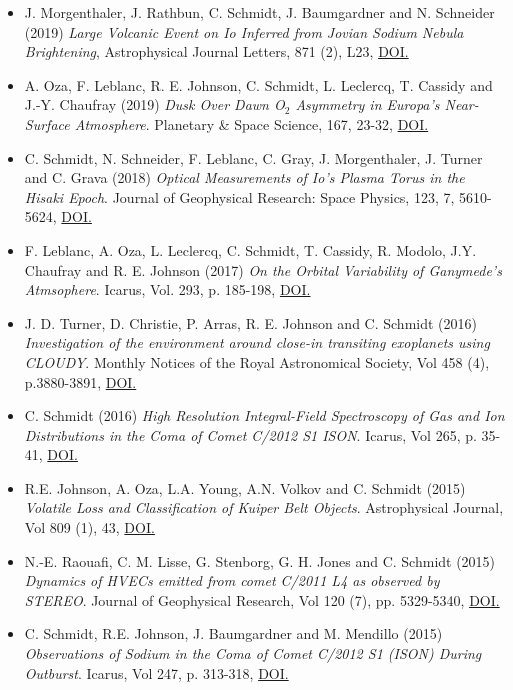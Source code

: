 \documentclass[12pt]{report}
\begin{document}
\begin{itemize}
  \item J. Morgenthaler, J. Rathbun, C. Schmidt, J. Baumgardner and N. Schneider (2019) \textit{Large Volcanic Event on Io Inferred from Jovian Sodium Nebula Brightening}, Astrophysical Journal Letters, 871 (2), L23, \href{https://doi.org/10.3847/2041-8213/aafdb7}{DOI.}
  \item A. Oza, F. Leblanc, R. E. Johnson, C. Schmidt, L. Leclercq, T. Cassidy and J.-Y. Chaufray (2019) \textit{Dusk Over Dawn O$_2$ Asymmetry in Europa's Near-Surface Atmosphere}. Planetary \& Space Science, 167, 23-32, \href{https://doi.org/10.1016/j.pss.2019.01.006}{DOI.}
  \item C. Schmidt, N. Schneider, F. Leblanc, C. Gray, J. Morgenthaler, J. Turner and C. Grava (2018) \textit{Optical Measurements of Io's Plasma Torus in the Hisaki Epoch}. Journal of Geophysical Research: Space Physics, 123, 7, 5610-5624, \href{https://doi.org/10.1029/2018JA025296}{DOI.}
  \item F. Leblanc, A. Oza, L. Leclercq, C. Schmidt, T. Cassidy, R. Modolo, J.Y. Chaufray and R. E. Johnson (2017) \textit{On the Orbital Variability of Ganymede's Atmsophere}. Icarus, Vol. 293, p. 185-198, \href{doi.org/10.1016/j.icarus.2017.04.025}{DOI.}
  \item J. D. Turner, D. Christie, P. Arras, R. E. Johnson and C. Schmidt (2016) \textit{Investigation of the environment around close-in transiting exoplanets using CLOUDY}. Monthly Notices of the Royal Astronomical Society, Vol 458 (4), p.3880-3891, \href{https://doi.org/10.1093/mnras/stw556}{DOI.}
  \item C. Schmidt (2016) \textit{High Resolution Integral-Field Spectroscopy of Gas and Ion Distributions in the Coma of Comet C/2012 S1 ISON}. Icarus, Vol 265, p. 35-41, \href{https://doi.org/10.1016/j.icarus.2015.10.009}{DOI.}
  \item R.E. Johnson, A. Oza, L.A. Young, A.N. Volkov and C. Schmidt (2015) \textit{Volatile Loss and Classification of Kuiper Belt Objects}. Astrophysical Journal, Vol 809 (1), 43, \href{https://doi.org/10.1088/0004-637X/809/1/43}{DOI.}
  \item N.-E. Raouafi, C. M. Lisse, G. Stenborg, G. H. Jones and C. Schmidt (2015) \textit{Dynamics of HVECs emitted from comet C/2011 L4 as observed by STEREO}. Journal of Geophysical Research, Vol 120 (7), pp. 5329-5340, \href{https://doi.org/10.1002/2014JA020926}{DOI.}
  \item C. Schmidt, R.E. Johnson, J. Baumgardner and M. Mendillo (2015) \textit{Observations of Sodium in the Coma of Comet C/2012 S1 (ISON) During Outburst}. Icarus, Vol 247, p. 313-318, \href{https://doi.org/10.1016/j.icarus.2014.10.022}{DOI.}

\end{itemize}
\end{document}
